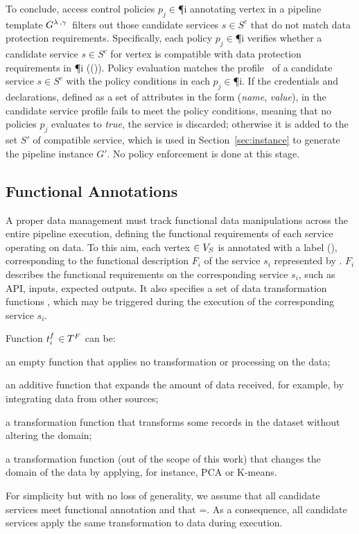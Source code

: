       To conclude, access control policies $p_j$$\in$\P{i} annotating vertex  in a pipeline template $G^{\lambda\,,\gamma\,}$ filters out those candidate services $s$$\in$$S^c$ that do not match data protection requirements. Specifically, each policy $p_j$$\in$\P{i} verifies whether a candidate service $s$$\in$$S^c$ for vertex  is compatible with data protection requirements in \P{i} (\myLambda()). Policy evaluation matches the profile \profile\ of a candidate service $s$$\in$$S^c$ with the policy conditions in each $p_j$$\in$\P{i}. If the credentials and declarations, defined as a set of attributes in the form (\emph{name}, \emph{value}), in the candidate service profile fails to meet the policy conditions, meaning that no policies $p_j$ evaluates to \emph{true}, the service is discarded; otherwise it is added to the set $S'$ of compatible service, which is used in Section~\ref{sec:instance} to generate the pipeline instance $G'$. No policy enforcement is done at this stage.

    \subsection{Functional Annotations}\label{sec:funcannotation}
    A proper data management must track functional data manipulations across the entire pipeline execution, defining the functional requirements of each service operating on data.
    To this aim, each vertex $\in V_S$ is annotated with a label \myGamma(), corresponding to the functional description $F_i$ of the service $s_i$ represented by .
  $F_i$ describes the functional requirements on the corresponding service $s_i$, such as API, inputs, expected outputs.
    It also specifies a set \TF{} of data transformation functions , which may be triggered during the execution of the corresponding service $s_i$.

    Function $t^f_{i}$$\in$$T^F_{}$ can be:
\begin{enumerate*}[label=\textit{\roman*})]
  \item an empty function \tf{\epsilon} that applies no transformation or processing on the data;
  \item an additive function  that expands the amount of data received, for example, by integrating data from other sources;
  \item a transformation function  that transforms some records in the dataset without altering the domain;
  \item a transformation function  (out of the scope of this work) that changes the domain of the data by applying, for instance, PCA or K-means.
\end{enumerate*}

For simplicity but with no loss of generality, we assume that all candidate services meet functional annotation \F{} and that \TF{}=\tf{}. As a consequence, all candidate services apply the same transformation to data during execution.

